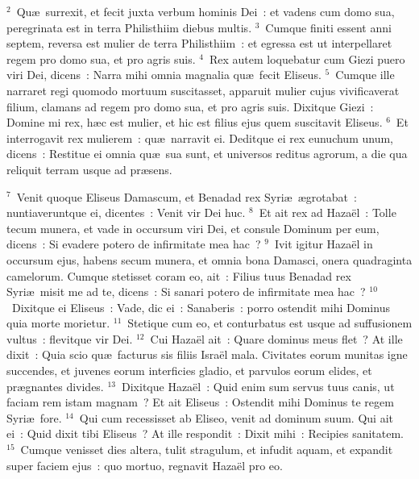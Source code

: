 ${}^{2}$~Qu\ae\ surrexit, et fecit juxta verbum hominis Dei~: et vadens cum domo sua, peregrinata est in terra Philisthiim diebus multis.
${}^{3}$~Cumque finiti essent anni septem, reversa est mulier de terra Philisthiim~: et egressa est ut interpellaret regem pro domo sua, et pro agris suis.
${}^{4}$~Rex autem loquebatur cum Giezi puero viri Dei, dicens~: Narra mihi omnia magnalia qu\ae\ fecit Eliseus.
${}^{5}$~Cumque ille narraret regi quomodo mortuum suscitasset, apparuit mulier cujus vivificaverat filium, clamans ad regem pro domo sua, et pro agris suis. Dixitque Giezi~: Domine mi rex, h\ae c est mulier, et hic est filius ejus quem suscitavit Eliseus.
${}^{6}$~Et interrogavit rex mulierem~: qu\ae\ narravit ei. Deditque ei rex eunuchum unum, dicens~: Restitue ei omnia qu\ae\ sua sunt, et universos reditus agrorum, a die qua reliquit terram usque ad pr\ae sens.


${}^{7}$~Venit quoque Eliseus Damascum, et Benadad rex Syri\ae\ \ae grotabat~: nuntiaveruntque ei, dicentes~: Venit vir Dei huc.
${}^{8}$~Et ait rex ad Haza\"el~: Tolle tecum munera, et vade in occursum viri Dei, et consule Dominum per eum, dicens~: Si evadere potero de infirmitate mea hac~?
${}^{9}$~Ivit igitur Haza\"el in occursum ejus, habens secum munera, et omnia bona Damasci, onera quadraginta camelorum. Cumque stetisset coram eo, ait~: Filius tuus Benadad rex Syri\ae\ misit me ad te, dicens~: Si sanari potero de infirmitate mea hac~?
${}^{10}$~Dixitque ei Eliseus~: Vade, dic ei~: Sanaberis~: porro ostendit mihi Dominus quia morte morietur.
${}^{11}$~Stetique cum eo, et conturbatus est usque ad suffusionem vultus~: flevitque vir Dei.
${}^{12}$~Cui Haza\"el ait~: Quare dominus meus flet~? At ille dixit~: Quia scio qu\ae\ facturus sis filiis Isra\"el mala. Civitates eorum munitas igne succendes, et juvenes eorum interficies gladio, et parvulos eorum elides, et pr\ae gnantes divides.
${}^{13}$~Dixitque Haza\"el~: Quid enim sum servus tuus canis, ut faciam rem istam magnam~? Et ait Eliseus~: Ostendit mihi Dominus te regem Syri\ae\ fore.
${}^{14}$~Qui cum recessisset ab Eliseo, venit ad dominum suum. Qui ait ei~: Quid dixit tibi Eliseus~? At ille respondit~: Dixit mihi~: Recipies sanitatem.
${}^{15}$~Cumque venisset dies altera, tulit stragulum, et infudit aquam, et expandit super faciem ejus~: quo mortuo, regnavit Haza\"el pro eo.



